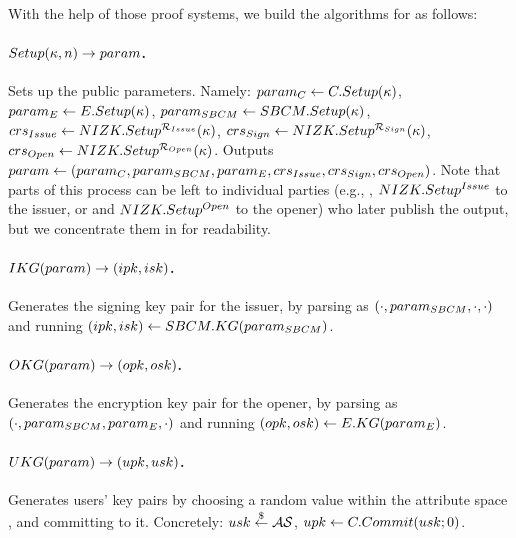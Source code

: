 With the help of those \NIZK proof systems, we build the algorithms for
\GSACGen as follows:

\paragraph{$Setup(\kappa,n) \rightarrow param$.} %
Sets up the public parameters. Namely: $param_C \gets C.Setup(\kappa)$, $param_{E}
\gets E.Setup(\kappa)$, $param_{SBCM} \gets SBCM.Setup(\kappa)$,
$crs_{Issue} \gets NIZK.Setup^{\mathcal{R}_{Issue}}(\kappa)$,
$crs_{Sign} \gets NIZK.Setup^{\mathcal{R}_{Sign}} (\kappa)$,
$crs_{Open}\gets NIZK.Setup^{\mathcal{R}_{Open}}(\kappa)$.
Outputs $param \gets (param_C,param_{SBCM},param_{E},crs_{Issue},crs_{Sign},
crs_{Open})$. Note that parts of this process can be left to individual
parties (e.g., \SBCMSetup, $NIZK.Setup^{Issue}$ to the issuer, or \ESetup and
$NIZK.Setup^{Open}$ to the opener) who later publish the output, but we
concentrate them in \Setup for readability.

\paragraph{$IKG(param) \rightarrow (ipk,isk)$.} %
Generates the signing key pair for the issuer, by parsing \parm as
$(\cdot,param_{SBCM},\cdot,\cdot)$ and running $(ipk,isk) \gets
SBCM.KG(param_{SBCM})$.

\paragraph{$OKG(param) \rightarrow (opk,osk)$.} %
Generates the encryption key pair for the opener, by parsing \parm as
$(\cdot,param_{SBCM},param_{E},\cdot)$ and running $(opk,osk) \gets
E.KG(param_{E})$.

\paragraph{$UKG(param) \rightarrow (upk,usk)$.} %
Generates users' key pairs by choosing a random value within the attribute space
\AttrSpace, and committing to it. Concretely: $usk \stackrel{\$}{\gets} \mathcal{AS}$, $upk
\gets C.Commit(usk; 0)$.

